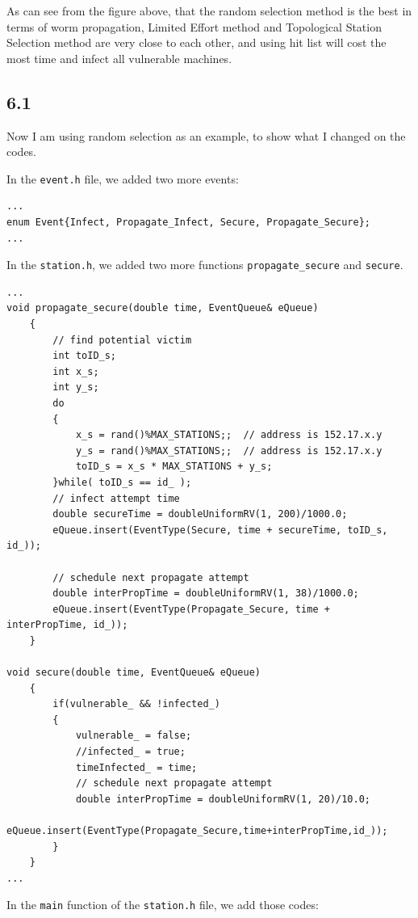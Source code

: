 \documentclass[10pt]{article}
\begin{document}
As can see from the figure above, that the random selection method is the best in terms of worm propagation, Limited Effort method and Topological Station Selection method are very close to each other, and using hit list will cost the most time and infect all vulnerable machines.


\subsection*{6.1}
Now I am using random selection as an example, to show what I changed on the codes.

In the \texttt{event.h} file, we added two more events:
\begin{lstlisting}
...
enum Event{Infect, Propagate_Infect, Secure, Propagate_Secure};
...
\end{lstlisting}

In the \texttt{station.h}, we added two more functions \texttt{propagate\_secure} and \texttt{secure}. 

\begin{lstlisting}
...
void propagate_secure(double time, EventQueue& eQueue)
	{
		// find potential victim
		int toID_s;
		int x_s;
		int y_s;
		do
		{
			x_s = rand()%MAX_STATIONS;;  // address is 152.17.x.y
			y_s = rand()%MAX_STATIONS;;  // address is 152.17.x.y
			toID_s = x_s * MAX_STATIONS + y_s;
		}while( toID_s == id_ );
		// infect attempt time
		double secureTime = doubleUniformRV(1, 200)/1000.0;  
		eQueue.insert(EventType(Secure, time + secureTime, toID_s, id_));

		// schedule next propagate attempt
		double interPropTime = doubleUniformRV(1, 38)/1000.0;
		eQueue.insert(EventType(Propagate_Secure, time + interPropTime, id_));
	}

void secure(double time, EventQueue& eQueue)
	{
		if(vulnerable_ && !infected_)
		{
			vulnerable_ = false;
			//infected_ = true;
			timeInfected_ = time;
			// schedule next propagate attempt
			double interPropTime = doubleUniformRV(1, 20)/10.0;
			eQueue.insert(EventType(Propagate_Secure,time+interPropTime,id_));
		}
	}
...
\end{lstlisting}

In the \texttt{main} function of the \texttt{station.h} file, we add those codes:
\end{document}
